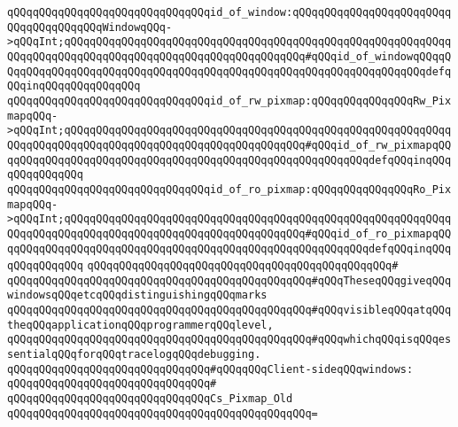 \verb|qQQqqQQqqQQqqQQqqQQqqQQqqQQqqQQqid_of_window:qQQqqQQqqQQqqQQqqQQqqQQqqQQqqQQqqQQqqQQqWindowqQQq->qQQqInt;qQQqqQQqqQQqqQQqqQQqqQQqqQQqqQQqqQQqqQQqqQQqqQQqqQQqqQQqqQQqqQQqqQQqqQQqqQQqqQQqqQQqqQQqqQQqqQQqqQQqqQQqqQQq#qQQqid_of_windowqQQqqQQqqQQqqQQqqQQqqQQqqQQqqQQqqQQqqQQqqQQqqQQqqQQqqQQqqQQqqQQqqQQqqQQqdefqQQqinqQQqqQQqqQQqqQQq|\newline
\verb|qQQqqQQqqQQqqQQqqQQqqQQqqQQqqQQqid_of_rw_pixmap:qQQqqQQqqQQqqQQqRw_PixmapqQQq->qQQqInt;qQQqqQQqqQQqqQQqqQQqqQQqqQQqqQQqqQQqqQQqqQQqqQQqqQQqqQQqqQQqqQQqqQQqqQQqqQQqqQQqqQQqqQQqqQQqqQQqqQQqqQQqqQQq#qQQqid_of_rw_pixmapqQQqqQQqqQQqqQQqqQQqqQQqqQQqqQQqqQQqqQQqqQQqqQQqqQQqqQQqqQQqdefqQQqinqQQqqQQqqQQqqQQq|\newline
\verb|qQQqqQQqqQQqqQQqqQQqqQQqqQQqqQQqid_of_ro_pixmap:qQQqqQQqqQQqqQQqRo_PixmapqQQq->qQQqInt;qQQqqQQqqQQqqQQqqQQqqQQqqQQqqQQqqQQqqQQqqQQqqQQqqQQqqQQqqQQqqQQqqQQqqQQqqQQqqQQqqQQqqQQqqQQqqQQqqQQqqQQqqQQq#qQQqid_of_ro_pixmapqQQqqQQqqQQqqQQqqQQqqQQqqQQqqQQqqQQqqQQqqQQqqQQqqQQqqQQqqQQqdefqQQqinqQQqqQQqqQQqqQQq|\newline
\verb|qQQqqQQqqQQqqQQqqQQqqQQqqQQqqQQqqQQqqQQqqQQqqQQq#|\newline
\verb|qQQqqQQqqQQqqQQqqQQqqQQqqQQqqQQqqQQqqQQqqQQqqQQq#qQQqTheseqQQqgiveqQQqwindowsqQQqetcqQQqdistinguishingqQQqmarks|\newline
\verb|qQQqqQQqqQQqqQQqqQQqqQQqqQQqqQQqqQQqqQQqqQQqqQQq#qQQqvisibleqQQqatqQQqtheqQQqapplicationqQQqprogrammerqQQqlevel,|\newline
\verb|qQQqqQQqqQQqqQQqqQQqqQQqqQQqqQQqqQQqqQQqqQQqqQQq#qQQqwhichqQQqisqQQqessentialqQQqforqQQqtracelogqQQqdebugging.|\newline
\newline
\newline
\newline
\verb|qQQqqQQqqQQqqQQqqQQqqQQqqQQqqQQq#qQQqqQQqClient-sideqQQqwindows:|\newline
\verb|qQQqqQQqqQQqqQQqqQQqqQQqqQQqqQQq#|\newline
\verb|qQQqqQQqqQQqqQQqqQQqqQQqqQQqqQQqCs_Pixmap_Old|\newline
\verb|qQQqqQQqqQQqqQQqqQQqqQQqqQQqqQQqqQQqqQQqqQQqqQQq=|\newline
